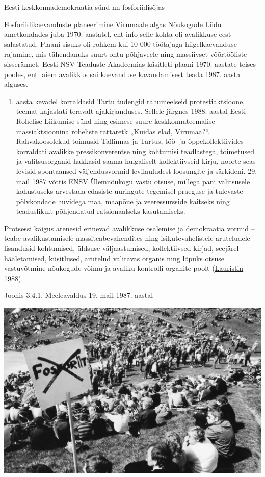 \documentclass[estonian,]{article}
\providecommand{\tightlist}{%
  \setlength{\itemsep}{0pt}\setlength{\parskip}{0pt}}
\begin{document}
Eesti keskkonnademokraatia sünd nn fosforiidisõjas

Fosforiidikaevanduste planeerimine Virumaale algas Nõukogude Liidu ametkondades juba 1970. aastatel, ent info selle kohta oli avalikkuse eest salastatud. Plaani sisuks oli rohkem kui 10 000 töötajaga hiigelkaevanduse rajamine, mis tähendanuks suurt ohtu põhjaveele ning massiivset võõrtööliste sisserännet. Eesti NSV Teaduste Akadeemias käsitleti plaani 1970. aastate teises pooles, ent laiem avalikkus sai kaevanduse kavandamisest teada 1987. aasta alguses.

\begin{enumerate}
\def\labelenumi{\arabic{enumi}.}
\setcounter{enumi}{1986}
\tightlist
\item
  aasta kevadel korraldasid Tartu tudengid rahumeelseid protestiaktsioone, teemat kajastati teravalt ajakirjanduses. Sellele järgnes 1988. aastal Eesti Rohelise Liikumise sünd ning esimese suure keskkonnateemalise massiaktsioonina roheliste rattaretk „Kuidas elad, Virumaa?``. Rahvakoosolekud toimusid Tallinnas ja Tartus, töö- ja õppekollektiivides korraldati avalikke pressikonverentse ning kohtumisi teadlastega, toimetused ja valitsusorganid hakkasid saama hulgaliselt kollektiivseid kirju, noorte seas levisid spontaansed väljendusvormid levilauludest loosungite ja särkideni. 29. mail 1987 võttis ENSV Ülemnõukogu vastu otsuse, millega pani valitsusele kohustuseks arvestada edasiste uuringute tegemisel praeguse ja tulevaste põlvkondade huvidega maa, maapõue ja veeressursside kaitseks ning teaduslikult põhjendatud ratsionaalseks kasutamiseks.
\end{enumerate}

Protsessi käigus arenesid erinevad avalikkuse osalemise ja demokraatia vormid -- teabe avalikustamisele massiteabevahendites ning isikutevahelistele aruteludele lisandusid kohtumised, üldsuse väljaastumised, kollektiivsed kirjad, seejärel hääletamised, küsitlused, arutelud valitavas organis ning lõpuks otsuse vastuvõtmine nõukogude võimu ja avaliku kontrolli organite poolt (\protect\hyperlink{Lauristin1988}{Lauristin 1988}).

{Joonis 3.4.1.} Meeleavaldus 19. mail 1987. aastal

\begin{center}\includegraphics[width=0.9\linewidth]{figures/3-chapter/fig341} \end{center}
\end{document}
